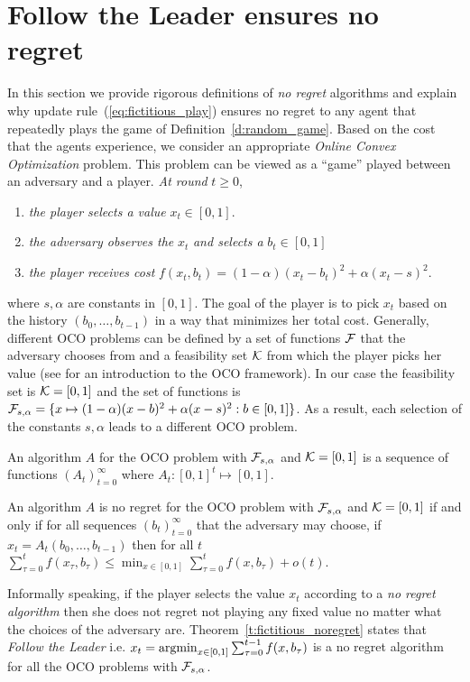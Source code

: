 \section{Follow the Leader ensures no regret}\label{s:fictitious_noregret}

In this section we provide rigorous definitions of \emph{no regret} algorithms
and explain why update rule~(\ref{eq:fictitious_play}) ensures
no regret to any agent that repeatedly plays the game of
Definition~\ref{d:random_game}.
Based on the cost that the agents experience,
we consider an appropriate \emph{Online Convex Optimization} problem.
This problem can be viewed as a \enquote{game} played between an
adversary and a player. \emph{At round }$t\geq 0$,
\begin{enumerate}
  \item \emph{the player selects a value }$x_t \in [0,1]$.
  \item \emph{the adversary observes the }$x_t$ \emph{and selects a} $b_t \in [0,1]$
  \item \emph{the player receives cost} $f(x_t,b_t)=(1-\alpha)(x_t-b_t)^2 + \alpha(x_t -s)^2$.
\end{enumerate}
where $s,\alpha$ are constants in $[0,1]$. The goal of
the player is to pick $x_t$ based on the history
$(b_0,\ldots,b_{t-1})$ in a way that minimizes her total cost.
Generally, different OCO problems can be defined by a set of functions
$\mathcal{F}$ that the adversary chooses from and a feasibility
set $\mathcal{K}$ from which the player picks her value (see \cite{Haz16}
for an introduction to the OCO framework).
In our case the feasibility set is $\mathcal{K}=[0,1]$ and the set of functions
is
$\mathcal{F}_{s,\alpha} = \{x \mapsto (1-\alpha)(x-b)^2 + \alpha(x -s)^2 : b \in [0,1]\}$.
As a result, each selection of the
constants $s,\alpha$ leads to a different OCO problem.

\begin{definition}\label{d:OCO_algo}
An algorithm $A$ for the OCO problem with $\mathcal{F}_{s,\alpha}$ and
$\mathcal{K}=[0,1]$ is a sequence of functions $(A_t)_{t=0}^\infty$ where $A_t:[0,1]^t \mapsto [0,1]$.
\end{definition}

\begin{definition}\label{d:no_regret_algo}
An algorithm $A$ is no regret for the OCO problem with $\mathcal{F}_{s,\alpha}$ and
$\mathcal{K}=[0,1]$ if and only if for all sequences $(b_t)_{t=0}^\infty$ that the
adversary may choose, if $x_t = A_t(b_0,\dots,b_{t-1})$ then for all $t$
\(\sum_{\tau=0}^t f(x_\tau,b_\tau)  \leq \min_{x \in [0,1]}\sum_{\tau=0}^t f(x,b_\tau) + o(t).\)
\end{definition}
Informally speaking, if the player selects the value
$x_t$ according to a \emph{no regret algorithm} then
she does not regret not playing any fixed value no
matter what the choices of the adversary are.
Theorem~\ref{t:fictitious_noregret} states that
\emph{Follow the Leader} i.e. $x_t = \operatorname*{argmin}_{x \in [0,1]}\sum_{\tau=0}^{t-1}f(x,b_\tau)$
is a no regret algorithm for all the OCO problems with $\mathcal{F}_{s,\alpha}$.

